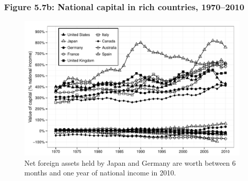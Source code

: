 \documentclass[t]{beamer}\usepackage[]{graphicx}\usepackage[]{color}
\newenvironment{knitrout}{}{} %
\begin{document}
\begin{frame}[label=Figure_5_7b]
\frametitle{Figure 5.7b: National capital in rich countries, 1970--2010}
\begin{figure}[t]
\begin{minipage}[b]{\textwidth}
\centering
\begin{knitrout}\footnotesize
{}\color{fgcolor}

{\centering \includegraphics[width=1\linewidth]{figures/bw/Figure_5_7b} 

}



\end{knitrout}
\caption{Net foreign assets held by Japan and Germany are worth between 6 months and one year of national income in 2010.}
\end{minipage}
\end{figure}
\end{frame}
\end{document}
